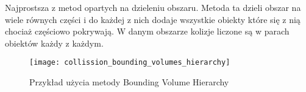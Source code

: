 \smallskip

Najprostsza z metod opartych na dzieleniu obszaru. Metoda ta dzieli obszar na wiele równych czę\'sci i do każdej z nich dodaje wszystkie obiekty które się z nią chociaż czę\'sciowo pokrywają. W danym obszarze kolizje liczone są w parach obiektów każdy z każdym.\\
\begin{figure}[h]
	\centering
	\noindent\texttt{[image: collission\_bounding\_volumes\_hierarchy]}
	\caption{Przykład użycia metody Bounding Volume Hierarchy}
\end{figure}\\
\newpage